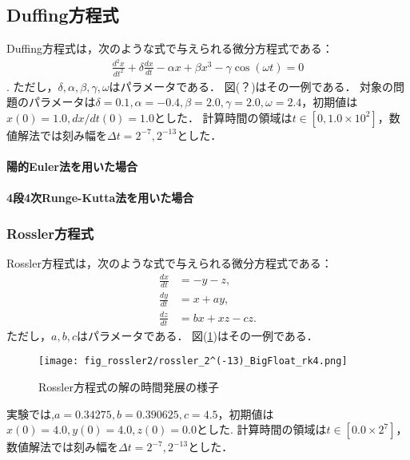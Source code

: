 \subsection{Duffing方程式}
Duffing方程式は，次のような式で与えられる微分方程式である：
\begin{align}
    \frac{d^2 x}{dt^2} + \delta\frac{dx}{dt} - \alpha x + \beta x^3 - \gamma \cos(\omega t) = 0
\end{align}.
ただし，$\delta,\alpha,\beta,\gamma,\omega$はパラメータである．
図(？)はその一例である．
対象の問題のパラメータは$\delta=0.1, \alpha=-0.4, \beta=2.0, \gamma=2.0, \omega=2.4$，初期値は$x(0) = 1.0, dx/dt(0) = 1.0$とした．
計算時間の領域は$t \in [0,1.0 \times 10^2]$，数値解法では刻み幅を$\Delta t =  2^{-7}, 2^{-13}$とした．
\paragraph*{陽的Euler法を用いた場合}

\paragraph*{4段4次Runge-Kutta法を用いた場合}

\subsubsection{Rossler方程式}
Rossler方程式は，次のような式で与えられる微分方程式である：
\begin{align}
    \frac{dx}{dt} &= -y-z, \\
    \frac{dy}{dt} &= x+ay, \\
    \frac{dz}{dt} &= bx + xz - cz.
\end{align}
ただし，$a,b,c$はパラメータである．
図(\ref{fig:rossler})はその一例である．
\begin{figure}[H]
    \centering
    \texttt{[image: fig\_rossler2/rossler\_2^(-13)\_BigFloat\_rk4.png]}
    \caption{Rossler方程式の解の時間発展の様子}
    \label{fig:rossler}
\end{figure}
実験では,$a=0.34275, b=0.390625, c=4.5$，初期値は$x(0) = 4.0, y(0) = 4.0, z(0) = 0.0$とした.
計算時間の領域は$t \in [0.0 \times 2^7]$，数値解法では刻み幅を$\Delta t =   2^{-7},2^{-13}$とした．
